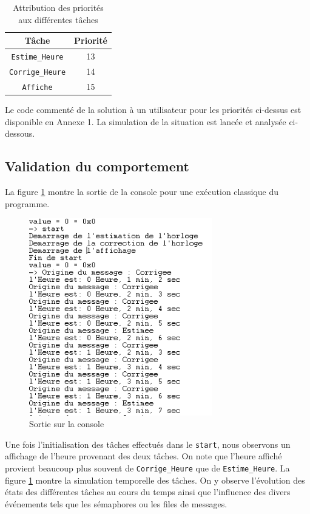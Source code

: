 \documentclass[french]{article}
\begin{document}
	\begin{table}[H]
		\centering
		\begin{tabular}{|c|c|}
			\hline
			Tâche & Priorité \\
			\hline
			\texttt{Estime\_Heure} & 13 \\
			\hline
			\texttt{Corrige\_Heure} & 14 \\
			\hline
			\texttt{Affiche} & 15 \\
			\hline
		\end{tabular}
		\caption{Attribution des priorités aux différentes tâches}
		\label{tab:priorite_taches}
	\end{table}



	Le code commenté de la solution à un utilisateur pour les priorités ci-dessus est disponible en Annexe 1. La simulation de la situation est lancée et analysée ci-dessous.
	
	\subsection{Validation du comportement}
	
	La figure \ref{fig:affichage_comportement_normal} montre la sortie de la console pour une exécution classique du programme.
		
	\begin{figure}[H]
		\centering
		\includegraphics[width=8cm]{photo/affichage_normal/affichage_comportement_normal}
		\caption{Sortie sur la console}
		\label{fig:affichage_comportement_normal}
	\end{figure}
	
	Une fois l'initialisation des tâches effectués dans le \texttt{start}, nous observons un affichage de l'heure provenant des deux tâches. On note que l'heure affiché provient beaucoup plus souvent de \texttt{Corrige\_Heure} que de \texttt{Estime\_Heure}. La figure \ref{fig:affichage_comportement_normal} montre la simulation temporelle des tâches. On y observe l'évolution des états des différentes tâches au cours du temps ainsi que l'influence des divers événements tels que les sémaphores ou les files de messages.  
	
\end{document}
